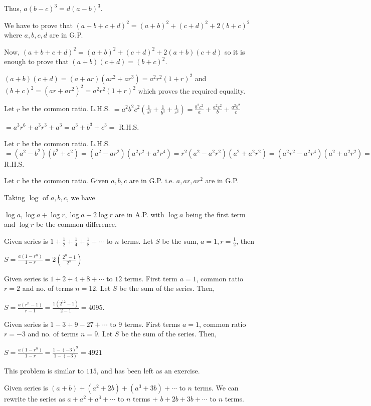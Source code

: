   Thus, $a(b - c)^3 = d(a - b)^3$.
\item We have to prove that $(a + b + c + d)^2 = (a + b)^2 + (c + d)^2 + 2(b + c)^2$ where $a, b, c, d$ are
  in G.P.

  Now, $(a + b + c + d)^2 = (a + b)^2 + (c + d)^2 + 2(a + b)(c + d)$ so it is enough to prove that $(a +
  b)(c + d) = (b + c)^2$.

  $(a + b)(c + d) = (a + ar)(ar^2 + ar^3) = a^2r^2(1 + r)^2$ and $(b + c)^2 = (ar + ar^2)^2 = a^2r^2(1 +
  r)^2$ which proves the required equality.
\item Let $r$ be the common ratio. L.H.S. $= a^2b^2c^2\left(\frac{1}{a^3} + \frac{1}{b^3} +
  \frac{1}{c^3}\right) = \frac{b^2c^2}{a} + \frac{a^2c^2}{b} + \frac{a^2b^2}{c}$

  $= a^3r^6 + a^3r^3 + a^3 = a^3 + b^3 + c^3 =$ R.H.S.
\item Let $r$ be the common ratio. L.H.S. $=(a^2 - b^2)(b^2 + c^2) = (a^2 - ar^2)(a^2r^2 + a^2r^4) = r^2(a^2
  - a^2r^2)(a^2 + a^2r^2) = (a^2r^2 - a^2r^4)(a^2 + a^2r^2) = (b^2 - c^2)(a^2 + b^2) =$ R.H.S.
\item Let $r$ be the common ratio. Given $a, b, c$ are in G.P. i.e. $a, ar, ar^2$ are in G.P.

  Taking $\log$ of $a, b, c$, we have

  $\log a, \log a + \log r, \log a + 2\log r$ are in A.P. with $\log a$ being the first term and $\log r$ be
  the common difference.
\item Given series is $1 + \frac{1}{2} + \frac{1}{4} + \frac{1}{8} + \cdots$ to $n$ terms. Let $S$ be the
  sum, $a = 1, r = \frac{1}{2}$, then

  $S = \frac{a(1 - r^n)}{1 - r} = 2\left(\frac{2^n - 1}{2^n}\right)$
\item Given series is $1 + 2 + 4 + 8 + \cdots$ to $12$ terms. First term $a = 1$, common ratio $r = 2$
  and no. of terms $n = 12$. Let $S$ be the sum of the series. Then,

  $S = \frac{a(r^n - 1)}{r - 1} = \frac{1(2^{12} - 1)}{2 - 1} = 4095$.
\item Given series is $1 - 3 + 9 - 27 + \cdots$ to $9$ terms. First terms $a = 1$, common ratio $r = -3$ and
  no. of terms $n = 9$. Let $S$ be the sum of the series. Then,

  $S = \frac{a(1 - r^n)}{1 - r} = \frac{1 - (-3)^9}{1 - (-3)} = 4921$
\item This problem is similar to $115$, and has been left as an exercise.
\item Given series is $(a + b) + (a^2 + 2b) + (a^3 + 3b) + \cdots $ to $n$ terms. We can rewrite the series
  as $a + a^2 + a^3 + \cdots$ to $n$ terms + $b + 2b + 3b + \cdots$ to $n$ terms.

